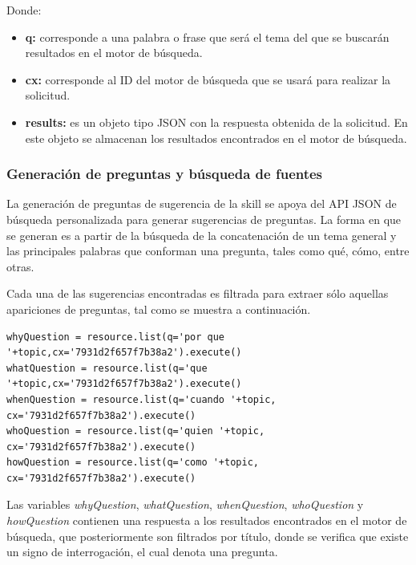 Donde:

\begin{itemize}
  \item \textbf{q:} corresponde a una palabra o frase que será el tema del que se buscarán resultados en el motor de búsqueda.
  \item \textbf{cx:} corresponde al ID del motor de búsqueda que se usará para realizar la solicitud.
  \item \textbf{results:} es un objeto tipo JSON con la respuesta obtenida de la solicitud. En este objeto se almacenan los resultados encontrados en el motor de búsqueda.
\end{itemize}


\subsubsection{Generación de preguntas y búsqueda de fuentes}
\label{GeneracionPreguntasBusquedaFuentescapIV}

La generación de preguntas de sugerencia de la skill se apoya del API JSON de búsqueda personalizada para generar sugerencias de preguntas. La forma en que se generan es a partir de la búsqueda de la concatenación de un tema general y las principales palabras que conforman una pregunta, tales como qué, cómo, entre otras.

Cada una de las sugerencias encontradas es filtrada para extraer sólo aquellas apariciones de preguntas, tal como se muestra a continuación.

\begin{tcolorbox}[colback=white!25!white,colframe=blue]
  \begin{verbatim}
whyQuestion = resource.list(q='por que '+topic,cx='7931d2f657f7b38a2').execute()
whatQuestion = resource.list(q='que '+topic,cx='7931d2f657f7b38a2').execute()
whenQuestion = resource.list(q='cuando '+topic, cx='7931d2f657f7b38a2').execute()
whoQuestion = resource.list(q='quien '+topic, cx='7931d2f657f7b38a2').execute()
howQuestion = resource.list(q='como '+topic, cx='7931d2f657f7b38a2').execute()
  \end{verbatim}
\end{tcolorbox}

Las variables \textit{whyQuestion}, \textit{whatQuestion}, \textit{whenQuestion}, \textit{whoQuestion} y \textit{howQuestion} contienen una respuesta a los resultados encontrados en el motor de búsqueda, que posteriormente son filtrados por título, donde se verifica que existe un signo de interrogación, el cual denota una pregunta.

